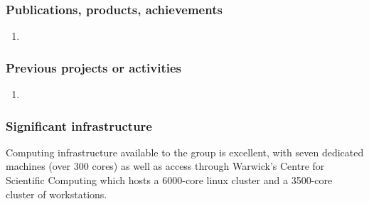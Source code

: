 

%
%
%

\subsubsection*{Publications, products, achievements}

\begin{enumerate}
\item {}
\end{enumerate}

\subsubsection*{Previous projects or activities}

\begin{enumerate}
\item {}
\end{enumerate}

\subsubsection*{Significant infrastructure}

Computing infrastructure available to the group is excellent, with
seven dedicated machines (over 300 cores) as well as access through
Warwick's Centre for Scientific Computing which hosts a 6000-core
linux cluster and a 3500-core cluster of workstations.
